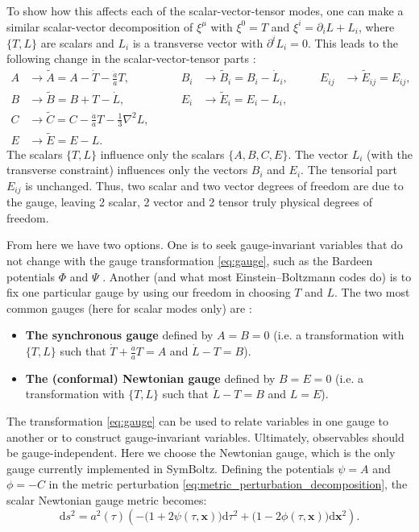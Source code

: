 \documentclass[USenglish, thumbmarks]{uiophdthesis} %
\newcommand\diff{\mathrm{d}}
\newcommand\EB{Einstein--Boltzmann}
\begin{document}
To show how this affects each of the scalar-vector-tensor modes,
one can make a similar scalar-vector decomposition of $\xi^\mu$ with $\xi^0 = T$ and $\xi^i = \partial_i L + L_i$,
where $\{T,L\}$ are scalars and $L_i$ is a transverse vector with $\partial^i L_i = 0$.
This leads to the following change in the scalar-vector-tensor parts \cite[e.g.][]{baumannNotes}:
\begin{equation}
\begin{alignedat}{3}
A &\to \tilde{A} = A - \dot{T} - \tfrac{\dot{a}}{a} T, \qquad &
B_i &\to \tilde{B}_i = B_i - \dot{L}_i, \qquad &
E_{ij} &\to \tilde{E}_{ij} = E_{ij}, \\
B &\to \tilde{B} = B + T - \dot{L}, \qquad&
E_i &\to \tilde{E}_i = E_i - L_i, \qquad& \\
C &\to \tilde{C} = C - \tfrac{\dot{a}}{a} T - \tfrac13\nabla^2 L, \qquad & & \\
E &\to \tilde{E} = E - L. \qquad & &
\end{alignedat}
\label{eq:gauge}
\end{equation}
The scalars $\{T,L\}$ influence only the scalars $\{A,B,C,E\}$.
The vector $L_i$ (with the transverse constraint) influences only the vectors $B_i$ and $E_i$.
The tensorial part $E_{ij}$ is unchanged.
Thus, two scalar and two vector degrees of freedom are due to the gauge,
leaving 2 scalar, 2 vector and 2 tensor truly physical degrees of freedom.

From here we have two options.
One is to seek gauge-invariant variables that do not change with the gauge transformation \eqref{eq:gauge},
such as the Bardeen potentials $\Phi$ and $\Psi$ \cite{bardeenGaugeinvariantCosmologicalPerturbations1980}.
Another (and what most \EB{} codes do) is to fix one particular gauge by using our freedom in choosing $T$ and $L$.
The two most common gauges (here for scalar modes only) are
\cite{maCosmologicalPerturbationTheory1995a}:
\begin{itemize}
\item \textbf{The synchronous gauge} defined by
$A=B=0$
(i.e. a transformation with $\{T,L\}$ such that $\dot{T} + \frac{\dot{a}}{a} T = A$ and $\dot{L}-T = B$).
\item \textbf{The (conformal) Newtonian gauge} defined by
$B=E=0$
(i.e. a transformation with $\{T,L\}$ such that $\dot{L} - T = B$ and $L = E$).
\end{itemize}

The transformation \eqref{eq:gauge} can be used
to relate variables in one gauge to another
or to construct gauge-invariant variables.
Ultimately, observables should be gauge-independent.
Here we choose the Newtonian gauge,
which is the only gauge currently implemented in SymBoltz.
Defining the potentials $\psi=A$ and $\phi=-C$ in the metric perturbation
\eqref{eq:metric_perturbation_decomposition}, the scalar Newtonian gauge metric becomes:
\begin{equation}
\diff{s}^2 = a^2(\tau) \left( -\big(1+2\psi(\tau, \mathbf{x})\big)\diff{\tau}^2 + \big(1-2\phi(\tau, \mathbf{x})\big) \diff{\mathbf{x}}^2 \right)
.
\label{eq:flrw_perturbed}
\end{equation}
\end{document}
